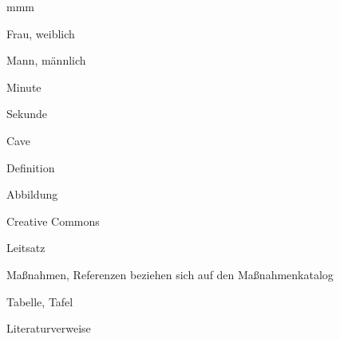 {\raggedright\ColumnFontNarrow%

\begin{labeling}{mmm}
  \item[\Female] Frau, weiblich
  \item[\Male] Mann, männlich
  \item[\Min] Minute 
  \item[\Sek] Sekunde  
  
  \item[\Ca{!}] Cave
  \item[\SymbolDefinition] Definition
  \item[\SignFigure] Abbildung
  \item[\libertineGlyph{creativecommons}] Creative Commons
  \item[\SignFazit] Leitsatz
  \item[\SignMassnahme] Maßnahmen, Referenzen beziehen
  sich auf den Maßnahmenkatalog
  \item[\SignTable] Tabelle, Tafel
  \item[\dsliterary] Literaturverweise
\end{labeling}

}
